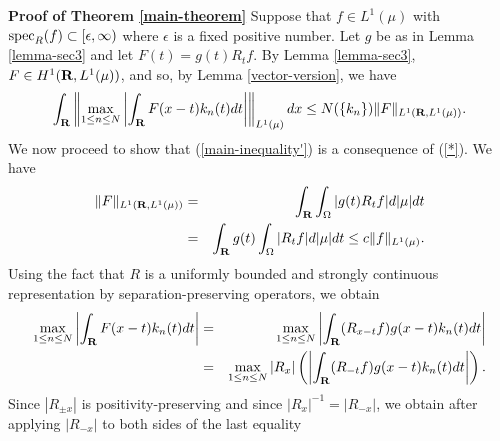 {\bf Proof of Theorem \ref{main-theorem}}
Suppose that $f\in L^1(\mu)$ with
${\rm spec}_R (f)\subset [\epsilon, \infty)$ where $\epsilon $
is a fixed positive number. 
Let $g$ be as in Lemma \ref{lemma-sec3} and let
$F(t)=g(t)R_tf$.  By Lemma \ref{lemma-sec3},
$F\in H^1(\R, L^1(\mu))$, and so, by 
Lemma \ref{vector-version}, we have
\begin{equation}
\int_\R \left\|
\max_{1\leq n\leq N}
\left| \int_\R
F(x-t)k_n(t) dt \right| 
\right\|_{L^1(\mu)}dx
\leq N(\{k_n\}) \|F\|_{L^1(\R,L^1(\mu))}.
\label{*}
\end{equation}
We now proceed to show that (\ref{main-inequality'})
is a consequence of (\ref{*}).  We have
\begin{eqnarray}
\|F\|_{L^1(\R,L^1(\mu))}
&=&
\int_\R \int_\O |g(t)R_tf|d|\mu | dt \nonumber\\
&=&
\int_\R g(t) \int_\O|R_tf|d | \mu | dt \leq c \|f\|_{L^1(\mu)}.
\label{**}
\end{eqnarray}
Using the fact that $R$ is a uniformly bounded and strongly
continuous representation by separation-preserving
operators, we obtain
\begin{eqnarray*}
\max_{1\leq n\leq N}
\left|
\int_\R F(x-t)k_n(t) dt
\right|
			&=&
\max_{1\leq n\leq N}
\left|
\int_\R
(R_{x-t} f) g(x-t) k_n(t) dt
\right|			\\
			&=&
\max_{1\leq n\leq N}
|R_x|\left(\left|
\int_\R
(R_{-t} f) g(x-t) k_n(t) dt
\right|\right).
\end{eqnarray*}
Since $|R_{\pm x}|$ is positivity-preserving
and since $|R_x|^{-1}=|R_{-x}|$, we obtain
after applying $|R_{-x}|$ to both sides of
the last equality
